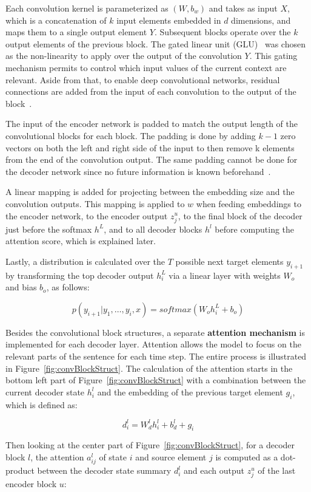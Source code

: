 Each convolution kernel is parameterized as $(W, b_w)$ and takes as input $X$, which is a 
concatenation of $k$ input elements embedded in $d$ dimensions, and maps them to a single 
output element $Y$. Subsequent blocks operate over the $k$ output elements of the previous 
block. The gated linear unit (GLU)~\cite{semPar:DauphinFAG16} was chosen as the non-linearity 
to apply over the output of the convolution $Y$. This gating mechanism permits to control which 
input values of the current context are relevant. Aside from that, to enable deep convolutional 
networks, residual connections are added from the input of each convolution to the output of the 
block~\cite{semPar:HeZRS15}.

The input of the encoder network is padded to match the output length of the convolutional 
blocks for each block. The padding is done by adding $k - 1$ zero vectors on both the left 
and right side of the input to then remove k elements from the end of the convolution output. 
The same padding cannot be done for the decoder network since no future information is known 
beforehand~\cite{semPar:OordKK16}.

A linear mapping is added for projecting between the embedding size and the convolution 
outputs. This mapping is applied to $w$ when feeding embeddings to the encoder network, to the 
encoder output $z_j^u$, to the final block of the decoder just before the softmax $h^L$, and 
to all decoder blocks $h^l$ before computing the attention score, which is explained later. 

Lastly, a distribution is calculated over the $T$ possible next target elements $y_{i+1}$ by 
transforming the top decoder output $h_i^L$ via a linear layer with weights $W_o$ and bias 
$b_o$, as follows:

\[
    p(y_{i+1}|y_1,\ldots,y_i,x)=softmax(W_o h_i^L + b_o)
\]

Besides the convolutional block structures, a separate \textbf{attention mechanism} is implemented 
for each decoder layer. Attention allows the model to focus on the relevant parts of the 
sentence for each time step. The entire process is illustrated in 
Figure~\ref{fig:convBlockStruct}. The calculation of the attention starts in the bottom left 
part of Figure~\ref{fig:convBlockStruct} with a combination between the current decoder state 
$h_i^l$ and the embedding of the previous target element $g_i$, which is defined as:

\[
    d_i^l= W_d^l h_i^l + b_d^l + g_i
\]

Then looking at the center part of Figure~\ref{fig:convBlockStruct}, for a decoder block $l$, 
the attention $a_{ij}^l$ of state $i$ and source element $j$ is computed as a dot-product 
between the decoder state summary $d_i^l$ and each output $z_j^u$ of the last encoder block $u$:


